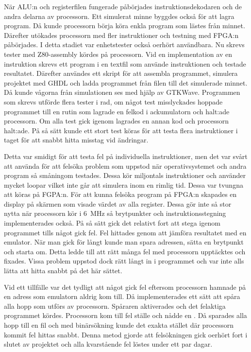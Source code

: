 \documentclass[main.tex]{subfiles}
\begin{document}
När ALU:n och registerfilen fungerade påbörjades instruktionsdekodaren och de
andra delarna av processorn. Ett simulerat minne byggdes också för att lagra
program. Då kunde processorn börja köra enkla program som lästes från minnet.
Därefter utökades processorn med fler instruktioner och testning med FPGA:n
påbörjades. I detta stadiet var enhetstester också oerhört användbara. Nu
skrevs tester med Z80-assembly kördes på processorn. Vid en implementation av
en instruktion skrevs ett program i en textfil som använde instruktionen och
testade resultatet. Därefter användes ett skript för att assembla programmet,
simulera projektet med GHDL och ladda programmet från filen till det simulerade
minnet. Då kunde vågorna från simulationen ses med hjälp av GTKWave.
Programmen som skrevs utförde flera tester i rad, om något test misslyckades
hoppade programmet till en rutin som lagrade en felkod i ackumulatorn och
halt:ade processorn. Om alla test gick igenom lagrades en annan kod och
processorn halt:ade. På så sätt kunde ett stort test köras för att testa flera
instruktioner i taget för att snabbt hitta misstag vid ändringar.

Detta var smidigt för att testa fel på individuella instruktioner, men det var
svårt att använda för att felsöka problem som uppstod när operativsystemet och
andra program så småningom testades. Dessa kör miljontals instruktioner och
använder mycket loopar vilket inte går att simulera inom en rimlig tid. Dessa
var tvungna att köras på FGPA:n. För att kunna felsöka program på FPGA:n
skapades en display på skärmen som visade värdet av alla register. Dessa gör
inte så stor nytta när processorn kör i \SI{6}{\mega\hertz} så brytpunkter och
instruktionsstegning implementerades också. På så sätt gick det relativt fort
att stega igenom programmet tills något gick fel. Fel hittades genom att
jämföra resultatet med en emulator. När man gick för långt kunde man spara
adressen, sätta en brytpunkt och starta om. Detta ledde till att rätt många fel
med processorn upptäcktes och fixades. Vissa problem uppstod dock rätt långt in
i programmet och var inte alls lätta att hitta snabbt på det här sättet.

Vid ett tillfälle var det tydligt att något gick fel eftersom processorn
hamnade på en adress som emulatorn aldrig kom till. Då implementerades ett sätt
att spåra alla hopp som utförs av processorn. Spåraren aktiverades och det
felaktiga programmet kördes. Processorn kom till fel ställe och nådde en
. Då sparades alla hopp till en fil och med binärsökning kunde det
exakta stället där processorn kommit fel hittas snabbt. Denna metod gjorde att
felsökningen gick oerhört fort i slutet av projektet och alla kvarstående fel
löstes under ett par dagar.
\end{document}
